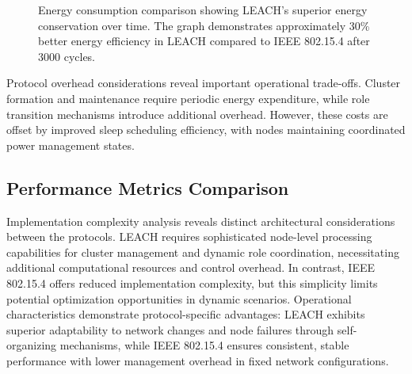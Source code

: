 \documentclass[conference]{IEEEtran}
\begin{document}
\begin{figure}[h!]
\centering
{}
\caption{Energy consumption comparison showing LEACH's superior energy conservation over time. The graph demonstrates approximately 30\% better energy efficiency in LEACH compared to IEEE 802.15.4 after 3000 cycles.}
\label{fig:energy_comparison}
\end{figure}

Protocol overhead considerations reveal important operational trade-offs. Cluster formation and maintenance require periodic energy expenditure, while role transition mechanisms introduce additional overhead. However, these costs are offset by improved sleep scheduling efficiency, with nodes maintaining coordinated power management states.

\subsection{Performance Metrics Comparison}

Implementation complexity analysis reveals distinct architectural considerations between the protocols. LEACH requires sophisticated node-level processing capabilities for cluster management and dynamic role coordination, necessitating additional computational resources and control overhead. In contrast, IEEE 802.15.4 offers reduced implementation complexity, but this simplicity limits potential optimization opportunities in dynamic scenarios. Operational characteristics demonstrate protocol-specific advantages: LEACH exhibits superior adaptability to network changes and node failures through self-organizing mechanisms, while IEEE 802.15.4 ensures consistent, stable performance with lower management overhead in fixed network configurations.
\end{document}
